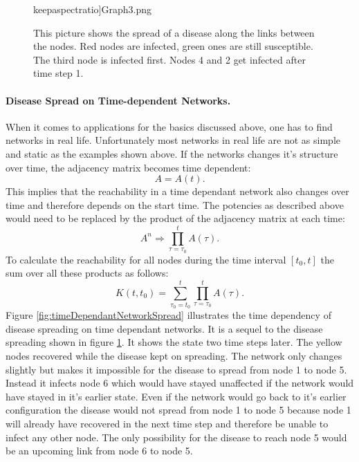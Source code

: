 \begin{figure}[htbp]
\begin{minipage}{0.5\textwidth}
keepaspectratio]{Graph3.png} 
\end{minipage}
\caption[Infection Spread On A Static Network]{This picture shows the spread of a disease along the links between the nodes. Red nodes are infected, green ones are still susceptible. The third node is infected first. Nodes 4 and 2 get infected after time step 1.}
\label{fig:disSpreadExampl}
\end{figure}

\paragraph{Disease Spread on Time-dependent Networks.}
When it comes to applications for the basics discussed above, one has to find networks in real life. Unfortunately most networks in real life are not as simple and static as the examples shown above. 
If the networks changes it's structure over time, the adjacency matrix becomes time dependent:
\begin{equation}
A = A(t).
\end{equation}
This implies that the reachability in a time dependant network also changes over time and therefore depends on the start time. The potencies as described above would need to be replaced by the product of the adjacency matrix at each time:
\begin{equation}
A^n \Rightarrow \prod_{\tau=\tau_0}^{t}A(\tau).
\end{equation}
To calculate the reachability for all nodes during the time interval $\left[t_0,t\right]$ the sum over all these products as follows:
\begin{equation}
K(t,t_0) = \sum_{\tau_0 = t_0}^{t} \prod_{\tau=\tau_0}^{t}A(\tau).
\end{equation}
Figure \ref{fig:timeDependantNetworkSpread} illustrates the time dependency of disease spreading on time dependant networks. It is a sequel to the disease spreading shown in figure \ref{fig:disSpreadExampl}. It shows the state two time steps later. The yellow nodes recovered while the disease kept on spreading.
The network only changes slightly but makes it impossible for the disease to spread from node 1 to node 5. Instead it infects node 6 which would have stayed unaffected if the network would have stayed in it's earlier state. Even if the network would go back to it's earlier configuration the disease would not spread from node 1 to node 5 because node 1 will already have recovered in the next time step and therefore be unable to infect any other node. The only possibility for the disease to reach node 5 would be an upcoming link from node 6 to node 5.
